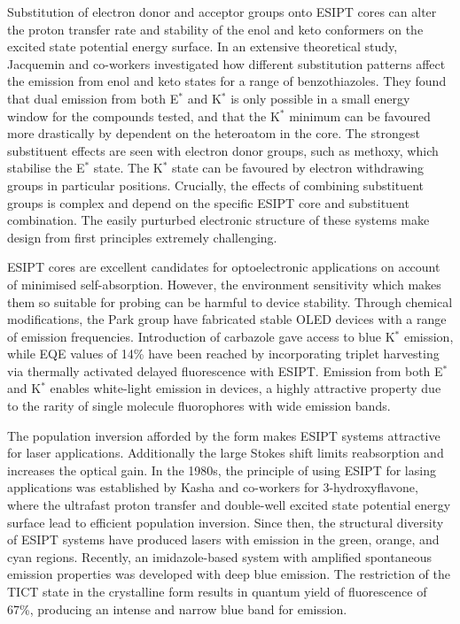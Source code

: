 Substitution of electron donor and acceptor groups onto \ac{ESIPT} cores can alter the proton transfer rate and stability of the enol and keto conformers on the excited state potential energy surface. In an extensive theoretical study, Jacquemin and co-workers investigated how different substitution patterns affect the emission from enol and keto states for a range of benzothiazoles.\cite{Azarias2016} They found that dual emission from both E$^*$ and K$^*$ is only possible in a small energy window for the compounds tested, and that the K$^*$ minimum can be favoured more drastically by dependent on the heteroatom in the core. The strongest substituent effects are seen with electron donor groups, such as methoxy, which stabilise the E$^*$ state. The K$^*$ state can be favoured by electron withdrawing groups in particular positions. Crucially, the effects of combining substituent groups is complex and depend on the specific \ac{ESIPT} core and substituent combination. The easily purturbed electronic structure of these systems make design from first principles extremely challenging.

\ac{ESIPT} cores are excellent candidates for optoelectronic applications on account of minimised self-absorption. However, the environment sensitivity which makes them so suitable for probing can be harmful to device stability.\cite{Kwon2011} Through chemical modifications, the Park group have fabricated stable \ac{OLED} devices with a range of emission frequencies.\cite{Park2008,Park2009,Kim2011} Introduction of carbazole gave access to blue K$^*$ emission, while \ac{EQE} values of 14\% have been reached by incorporating triplet harvesting via thermally activated delayed fluorescence with \ac{ESIPT}.\cite{Park2008,Mamada2017} Emission from both E$^*$ and K$^*$ enables white-light emission in devices, a highly attractive property due to the rarity of single molecule fluorophores with wide emission bands.\cite{Tang2011,Yao2011,Zhang2016b,Serdiuk2017}

The population inversion afforded by the \Kstar form makes \ac{ESIPT} systems attractive for laser applications.\cite{Fang2014,Gierschner2016} Additionally the large Stokes shift limits reabsorption and increases the optical gain.\cite{Kwon2011} In the 1980s, the principle of using \ac{ESIPT} for lasing applications was established by Kasha and co-workers for 3-hydroxyflavone, where the ultrafast proton transfer and double-well excited state potential energy surface lead to efficient population inversion.\cite{Khan1983,Chou1984} Since then, the structural diversity of \ac{ESIPT} systems have produced lasers with emission in the green, orange, and cyan regions.\cite{Sakai2016,Chen2016,Park2012,Park2008} Recently, an imidazole-based system with amplified spontaneous emission properties was developed with deep blue emission.\cite{Park2017} The restriction of the \ac{TICT} state in the crystalline form results in quantum yield of fluorescence of 67\%, producing an intense and narrow blue band for emission. 
